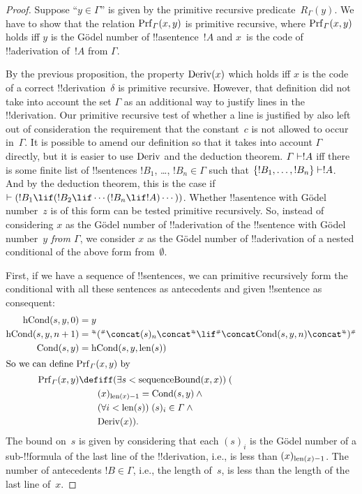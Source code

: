 \documentclass[../../../include/open-logic-section]{subfiles}
\begin{document}
\begin{proof}
Suppose ``$y \in \Gamma$'' is given by the primitive recursive
predicate~$R_\Gamma(y)$.  We have to show that the relation
$\Prf[\Gamma](x, y)$ is primitive recursive, where $\Prf[\Gamma](x,
y)$ holds iff $y$ is the G\"odel number of !!a{sentence}~$!A$ and
$x$~is the code of !!a{derivation} of~$!A$ from $\Gamma$.

By the previous proposition, the property $\mathrm{Deriv}(x)$ which holds
iff $x$ is the code of a correct !!{derivation}~$\delta$ is primitive
recursive. However, that definition did not take into account the set
$\Gamma$ as an additional way to justify lines in the !!{derivation}. Our
primitive recursive test of whether a line is justified by \QR{} also
left out of consideration the requirement that the constant~$c$ is not
allowed to occur in~$\Gamma$. It is possible to amend our definition so
that it takes into account $\Gamma$ directly, but it is easier to use
$\mathrm{Deriv}$ and the deduction theorem. $\Gamma \Proves !A$ iff
there is some finite list of !!{sentence}s $!B_1$, \dots, $!B_n \in
\Gamma$ such that $\{!B_1, \dots, !B_n\} \Proves !A$. And by the
deduction theorem, this is the case if $\Proves (!B_1 \lif (!B_2 \lif
\cdots (!B_n \lif !A)\cdots))$. Whether !!a{sentence} with G\"odel
number~$z$ is of this form can be tested primitive recursively.  So,
instead of considering $x$ as the G\"odel number of !!a{derivation} of
the !!{sentence} with G\"odel number~$y$ \emph{from $\Gamma$}, we consider
$x$ as the G\"odel number of !!a{derivation} of a nested conditional
of the above form from~$\emptyset$.

First, if we have a sequence of !!{sentence}s, we can primitive
recursively form the conditional with all these sentences as
antecedents and given !!{sentence} as consequent:
\begin{align*}
  \fn{hCond}(s, y, 0) & = y \\
  \fn{hCond}(s, y, n+1) & = \Gn{(} \concat (s)_{n} \concat \Gn{\lif}
  \concat \fn{Cond}(s, y, n) \concat \Gn{)}\\
  \fn{Cond}(s, y) & = \fn{hCond}(s, y, \len{s})\\
  \intertext{So we can define $\Prf[\Gamma](x, y)$ by}
  \Prf[\Gamma](x, y) & \defiff \bexists{s < \fn{sequenceBound}(x,x)}{(} \\
  &\qquad (x)_{\len{x}-1} = \fn{Cond}(s,y) \land {} \\
  &\qquad\bforall{i<\len{s}}{(s)_i \in \Gamma} \land {} \\
  &\qquad\fn{Deriv}(x)).
\end{align*}
The bound on~$s$ is given by considering that each $(s)_i$ is the
G\"odel number of a sub-!!{formula} of the last line of the !!{derivation},
i.e., is less than $(x)_{\mathrm{len}(x)-1}$. The number of antecedents $!B
\in \Gamma$, i.e., the length of~$s$, is less than the length of the
last line of~$x$.
\end{proof}
\end{document}
